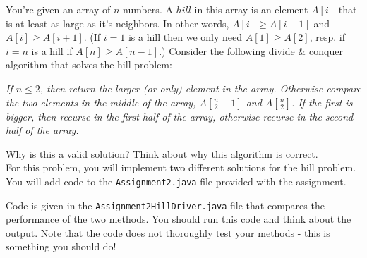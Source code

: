 \documentclass[11pt,answers]{exam}
\begin{document}
\begin{questions}
\question[6] You're given an array of $n$ numbers. A $hill$ in this array is an element
    $A[i]$ that is at least as large as it's neighbors. In other words,
    $A[i] \geq A[i-1]$ and $A[i] \geq A[i+1]$.
    (If $i=1$ is a hill then we only need $A[1] \geq A[2]$, resp. if $i = n$
    is a hill if $A[n] \geq A[n-1]$.)  Consider the following divide \& conquer algorithm that solves the hill problem:
    
\emph{If $n \leq 2$, then return the larger (or only) element in the array. 
        Otherwise compare the two elements in the middle of the array,
        $A[\frac{n}{2} -1]$ and $A[\frac{n}{2}]$. If the first is bigger, then
        recurse in the first half of the array, otherwise recurse in the
        second half of the array.}
        
Why is this a valid solution?  Think about why this algorithm is correct. \\

For this problem, you will implement two different solutions for the hill problem.  You will add code to the \texttt{Assignment2.java} file provided with the assignment.  
      Code is given in the \texttt{Assignment2HillDriver.java} file that compares the performance of the two methods.  You should run this code and think about the output.  Note that the code does not thoroughly test your methods - this is something you should do!   \\
      
       \end{questions}
\end{document}
